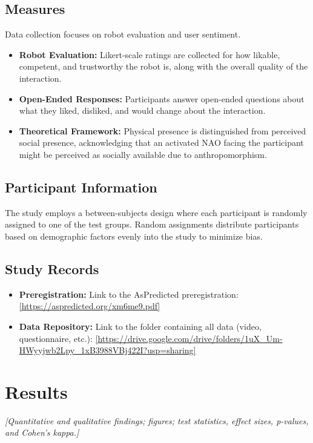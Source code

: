 \documentclass[sigconf,nonacm]{acmart}
\newcommand{\placeholder}[1]{\textit{[#1]}}
\newif\ifdraftspacing
\newcommand{\draftspace}[1]{\ifdraftspacing\par\vspace*{#1}\fi}
\newcommand{\draftpage}{\ifdraftspacing\clearpage\fi}
\begin{document}
\subsection{Measures}
Data collection focuses on robot evaluation and user sentiment.
\begin{itemize}
    \item \textbf{Robot Evaluation:} Likert-scale ratings are collected for how likable, competent, and trustworthy the robot is, along with the overall quality of the interaction.
    \item \textbf{Open-Ended Responses:} Participants answer open-ended questions about what they liked, disliked, and would change about the interaction.
    \item \textbf{Theoretical Framework:} Physical presence is distinguished from perceived social presence, acknowledging that an activated NAO facing the participant might be perceived as socially available due to anthropomorphism.
\end{itemize}

\subsection{Participant Information}
The study employs a between-subjects design where each participant is randomly assigned to one of the test groups. Random assignments distribute participants based on demographic factors evenly into the study to minimize bias.

\subsection{Study Records}
\begin{itemize}
    \item \textbf{Preregistration:} Link to the AsPredicted preregistration: \url{[https://aspredicted.org/xm6me9.pdf]}
    \item \textbf{Data Repository:} Link to the folder containing all data (video, questionnaire, etc.): \url{[https://drive.google.com/drive/folders/1uX_Um-HWyyjwb2Lpy_1xB3988VBj422I?usp=sharing]}
\end{itemize}

\section{Results}
\label{sec:results}
\placeholder{Quantitative and qualitative findings; figures; test statistics,
effect sizes, p-values, and Cohen's kappa.}
\draftspace{120mm}
\draftpage
\end{document}
